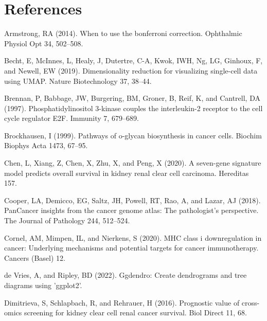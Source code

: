 \documentclass[
  parskip,
  openany]{scrreprt}
\newlength{\cslhangindent}
\newlength{\cslentryspacingunit} %
\newenvironment{CSLReferences}[2] %
 {%
  \setlength{\parindent}{0pt}
  \ifodd #1
  \let\oldpar\par
  \def\par{\hangindent=\cslhangindent\oldpar}
  \fi
  \setlength{\parskip}{#2\cslentryspacingunit}
 }%
 {}
\begin{document}
\hypertarget{references}{%
\chapter{References}\label{references}}

\hypertarget{refs}{}
\begin{CSLReferences}{0}{0}
\leavevmode{}%
Armstrong, RA (2014). When to use the bonferroni correction. Ophthalmic
Physiol Opt 34, 502--508.

\leavevmode{}%
Becht, E, McInnes, L, Healy, J, Dutertre, C-A, Kwok, IWH, Ng, LG,
Ginhoux, F, and Newell, EW (2019). Dimensionality reduction for
visualizing single-cell data using UMAP. Nature Biotechnology 37,
38--44.

\leavevmode{}%
Brennan, P, Babbage, JW, Burgering, BM, Groner, B, Reif, K, and
Cantrell, DA (1997). Phosphatidylinositol 3-kinase couples the
interleukin-2 receptor to the cell cycle regulator E2F. Immunity 7,
679--689.

\leavevmode{}%
Brockhausen, I (1999). Pathways of o-glycan biosynthesis in cancer
cells. Biochim Biophys Acta 1473, 67--95.

\leavevmode{}%
Chen, L, Xiang, Z, Chen, X, Zhu, X, and Peng, X (2020). A seven-gene
signature model predicts overall survival in kidney renal clear cell
carcinoma. Hereditas 157.

\leavevmode{}%
Cooper, LA, Demicco, EG, Saltz, JH, Powell, RT, Rao, A, and Lazar, AJ
(2018). PanCancer insights from the cancer genome atlas: The
pathologist's perspective. The Journal of Pathology 244, 512--524.

\leavevmode{}%
Cornel, AM, Mimpen, IL, and Nierkens, S (2020). MHC class i
downregulation in cancer: Underlying mechanisms and potential targets
for cancer immunotherapy. Cancers (Basel) 12.

\leavevmode{}%
de Vries, A, and Ripley, BD (2022). Ggdendro: Create dendrograms and
tree diagrams using 'ggplot2'.

\leavevmode{}%
Dimitrieva, S, Schlapbach, R, and Rehrauer, H (2016). Prognostic value
of cross-omics screening for kidney clear cell renal cancer survival.
Biol Direct 11, 68.


\end{CSLReferences}
\end{document}
